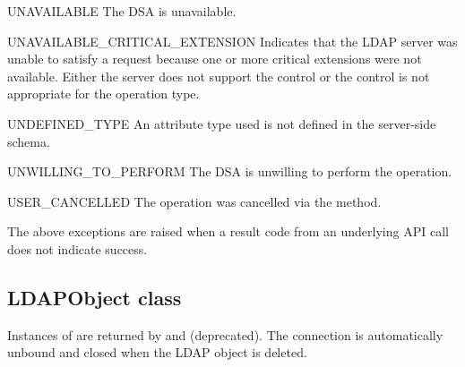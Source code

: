 \begin{excdesc}{UNAVAILABLE}
The DSA is unavailable.
\end{excdesc}
\begin{excdesc}{UNAVAILABLE_CRITICAL_EXTENSION}
Indicates that the LDAP server was unable to satisfy a request
because one or more critical extensions were not available. Either
the server does not support the control or the control is not appropriate
for the operation type.
\end{excdesc}
\begin{excdesc}{UNDEFINED_TYPE}
An attribute type used is not defined in the server-side schema.
\end{excdesc}
\begin{excdesc}{UNWILLING_TO_PERFORM}
The  DSA  is  unwilling to perform the operation.
\end{excdesc}
\begin{excdesc}{USER_CANCELLED}
The operation was cancelled via the  method.
\end{excdesc}

The above exceptions are raised when a result code from an underlying API
call does not indicate success.

%

\subsection{LDAPObject class \label{ldap-objects}}


Instances of  are returned by 
and  (deprecated). The connection is automatically unbound
and closed  when the LDAP object is deleted.

